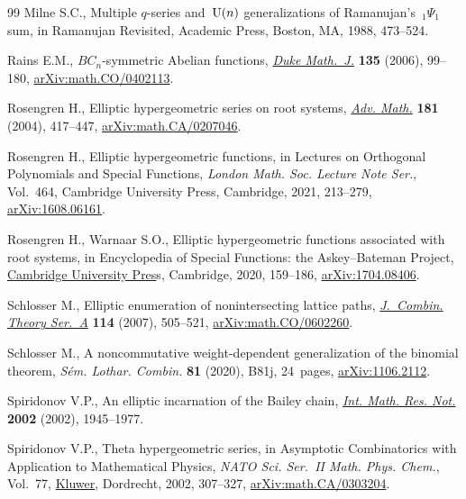 \documentclass[pdftex]{sigma}
\numberwithin{equation}{section}
\theoremstyle{definition}
\begin{document}
\begin{thebibliography}{99}
Milne S.C., Multiple {$q$}-series and~{${\rm U}(n)$} generalizations of
 {R}amanujan's~{$_1\Psi_1$} sum, in Ramanujan {R}evisited, Academic Press,
 Boston, MA, 1988, 473--524.

Rains E.M., {$BC_n$}-symmetric {A}belian functions,
 \href{https://doi.org/10.1215/S0012-7094-06-13513-5}{\textit{Duke Math.~J.}}
 \textbf{135} (2006), 99--180,
 \href{http://arxiv.org/abs/math.CO/0402113}{arXiv:math.CO/0402113}.

Rosengren H., Elliptic hypergeometric series on root systems,
 \href{https://doi.org/10.1016/S0001-8708(03)00071-9}{\textit{Adv. Math.}}
 \textbf{181} (2004), 417--447,
 \href{http://arxiv.org/abs/math.CA/0207046}{arXiv:math.CA/0207046}.

Rosengren H., Elliptic hypergeometric functions, in Lectures on {O}rthogonal
 {P}olynomials and {S}pecial {F}unctions, \textit{London Math. Soc. Lecture
 Note Ser.}, Vol.~464, Cambridge University Press, Cambridge, 2021, 213--279,
 \href{http://arxiv.org/abs/1608.06161}{arXiv:1608.06161}.

Rosengren H., Warnaar S.O., Elliptic hypergeometric functions associated with
 root systems, in Encyclopedia of {S}pecial {F}unctions: the
 {A}skey--{B}ateman {P}roject,
 \href{https://doi.org/10.1017/9780511777165.007}{Cambridge University Pres}s,
 Cambridge, 2020, 159--186,
 \href{http://arxiv.org/abs/1704.08406}{arXiv:1704.08406}.

Schlosser M., Elliptic enumeration of nonintersecting lattice paths,
 \href{https://doi.org/10.1016/j.jcta.2006.07.002}{\textit{J.~Combin. Theory
 Ser.~A}} \textbf{114} (2007), 505--521,
 \href{http://arxiv.org/abs/math.CO/0602260}{arXiv:math.CO/0602260}.

Schlosser M., A noncommutative weight-dependent generalization of the binomial
 theorem, \textit{S\'em. Lothar. Combin.} \textbf{81} (2020), B81j, 24~pages,
 \href{http://arxiv.org/abs/1106.2112}{arXiv:1106.2112}.

Spiridonov V.P., An elliptic incarnation of the {B}ailey chain,
 \href{https://doi.org/10.1155/S1073792802205127}{\textit{Int. Math. Res.
 Not.}} \textbf{2002} (2002), 1945--1977.

Spiridonov V.P., Theta hypergeometric series, in Asymptotic {C}ombinatorics
 with {A}pplication to {M}athematical {P}hysics, \textit{NATO Sci. Ser.~II
 Math. Phys. Chem.}, Vol.~77,
 \href{https://doi.org/10.1007/978-94-010-0575-3_15}{Kluwer}, Dordrecht, 2002,
 307--327, \href{http://arxiv.org/abs/math.CA/0303204}{arXiv:math.CA/0303204}.


\end{thebibliography}
\end{document}
